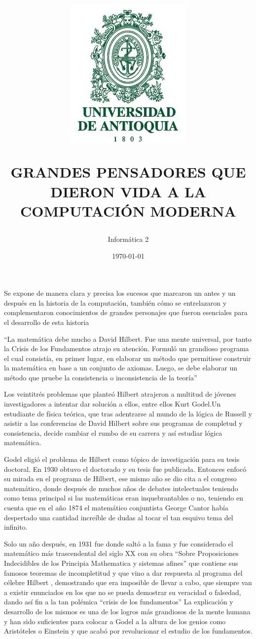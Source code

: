 \documentclass{article}
\title{      \includegraphics[scale=0.5]{logo-universidad-de-antioquia.png}

GRANDES PENSADORES QUE DIERON VIDA A LA COMPUTACIÓN MODERNA}
\author{Informática 2
}
\date{\today}
\begin{document}
\maketitle 

Se expone de manera clara y precisa los sucesos que marcaron un antes y un después en la historia de la computación, también cómo se entrelazaron y complementaron conocimientos de grandes personajes que fueron esenciales para el desarrollo de esta historia


“La matemática debe mucho a David Hilbert. Fue una mente universal,  por tanto la Crisis de los Fundamentos atrajo su atención. Formuló un grandioso programa  el cual consistía, en primer lugar, en elaborar un método que permitiese construir la matemática en base a un conjunto de axiomas. Luego, se debe elaborar un método que pruebe la consistencia o inconsistencia de la teoría” \cite{ortizcrisis}

Los veintitrés problemas que planteó Hilbert atrajeron a multitud de jóvenes investigadores a intentar dar solución a ellos, entre ellos Kurt Godel.Un estudiante de física teórica, que tras adentrarse al mundo de la lógica de Russell y asistir a las conferencias de David Hilbert sobre sus programas de completud y consistencia, decide cambiar el rumbo de su carrera y así estudiar lógica matemática.

Godel eligió el problema de Hilbert como tópico de investigación para su tesis doctoral.
En 1930 obtuvo el doctorado y su tesis fue publicada. Entonces enfocó su mirada en el programa de Hilbert, ese mismo año se dio cita a el congreso matemático, donde después de muchos años de debates intelectuales teniendo como tema principal si las matemáticas eran inquebrantables o no,  teniendo en cuenta que en el año 1874 el matemático conjuntista George Cantor había despertado una cantidad increíble de dudas al tocar el tan esquivo tema del infinito.
 
Solo un año después, en 1931 fue donde saltó a la fama y fue considerado el matemático más trascendental del siglo XX  con su obra “Sobre Proposiciones Indecidibles de los Principia Mathematica y sistemas afines” que contiene sus famosos teoremas de incompletitud  y que vino a dar respuesta al programa del célebre  Hilbert , demostrando que  era imposible de llevar a cabo, que siempre van a existir enunciados en los que no se pueda demostrar su veracidad o falsedad, dando así fin a la tan polémica “crisis de los fundamentos” La explicación y desarrollo de los mismos es una de los logros más grandiosos de la mente humana y han sido suficientes para colocar a Godel a la altura de los genios como Aristóteles o Einstein y que acabó por revolucionar el estudio de los fundamentos.
 
\end{document}
